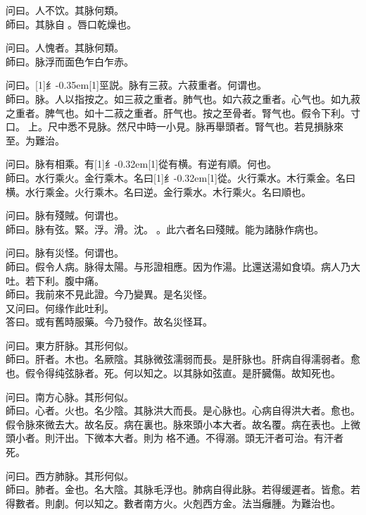 \documentclass[11pt,oneside,b5paper]{ctexbook}
\begin{document}
\begin{flushleft}
问曰。人不饮。其脉何類。\\
師曰。其脉自{𬈧}。唇口乾燥也。

问曰。人愧者。其脉何類。\\
師曰。脉浮而面色乍白乍赤。

问曰。{\hbox{\scalebox{0.68}[1]{纟}\kern-0.35em\scalebox{0.64}[1]{巠}}}説。脉有三菽。六菽重者。何谓也。\\
師曰。脉。人以指按之。如三菽之重者。肺气也。如六菽之重者。心气也。如九菽之重者。脾气也。如十二菽之重者。肝气也。按之至骨者。腎气也。假令下利。寸口。{𬮦}上。尺中悉不見脉。然尺中時一小見。脉再舉頭者。腎气也。若見損脉來至。为難治。

问曰。脉有相乘。有{\hbox{\scalebox{0.6}[1]{纟}\kern-0.32em\scalebox{0.7}[1]{從}}}有横。有逆有順。何也。\\
師曰。水行乘火。金行乘木。名曰{\hbox{\scalebox{0.6}[1]{纟}\kern-0.32em\scalebox{0.7}[1]{從}}}。火行乘水。木行乘金。名曰横。水行乘金。火行乘木。名曰逆。金行乘水。木行乘火。名曰順也。

问曰。脉有殘賊。何谓也。\\
師曰。脉有弦。緊。浮。滑。沈。{𬈧}。此六者名曰殘賊。能为諸脉作病也。

问曰。脉有災怪。何谓也。\\
師曰。假令人病。脉得太陽。与形證相應。因为作湯。比還送湯如食頃。病人乃大吐。若下利。腹中痛。\\
師曰。我前來不見此證。今乃變異。是名災怪。\\
又问曰。何缘作此吐利。\\
答曰。或有舊時服藥。今乃發作。故名災怪耳。

问曰。東方肝脉。其形何似。\\
師曰。肝者。木也。名厥陰。其脉微弦濡弱而長。是肝脉也。肝病自得濡弱者。愈也。假令得纯弦脉者。死。何以知之。以其脉如弦直。是肝臓傷。故知死也。

问曰。南方心脉。其形何似。\\
師曰。心者。火也。名少陰。其脉洪大而長。是心脉也。心病自得洪大者。愈也。假令脉來微去大。故名反。病在裏也。脉來頭小本大者。故名覆。病在表也。上微頭小者。則汗出。下微本大者。則为{𬮦}格不通。不得溺。頭无汗者可治。有汗者死。

问曰。西方肺脉。其形何似。\\
師曰。肺者。金也。名大陰。其脉毛浮也。肺病自得此脉。若得缓遲者。皆愈。若得數者。則劇。何以知之。數者南方火。火剋西方金。法当癰腫。为難治也。


\end{flushleft}
\end{document}
